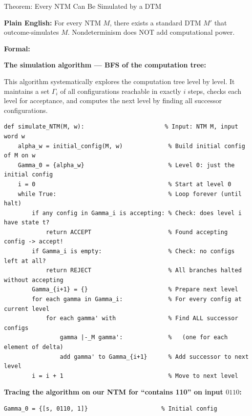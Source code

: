 \documentclass[11pt,a4paper]{article}
\begin{document}
\begin{definitionbox}{{Theorem: Every NTM Can Be Simulated by a DTM}}

\textbf{Plain English:} For every NTM $M$, there exists a standard DTM $M'$ that outcome-simulates $M$. Nondeterminism does NOT add computational power.

\textbf{Formal:}
\begin{center}
\end{center}

\textbf{The simulation algorithm --- BFS of the computation tree:}

This algorithm systematically explores the computation tree level by level. It maintains a set $\Gamma_i$ of all configurations reachable in exactly $i$ steps, checks each level for acceptance, and computes the next level by finding all successor configurations.

\begin{lstlisting}
def simulate_NTM(M, w):                       % Input: NTM M, input word w
    alpha_w = initial_config(M, w)             % Build initial config of M on w
    Gamma_0 = {alpha_w}                        % Level 0: just the initial config
    i = 0                                      % Start at level 0
    while True:                                % Loop forever (until halt)
        if any config in Gamma_i is accepting: % Check: does level i have state t?
            return ACCEPT                      % Found accepting config -> accept!
        if Gamma_i is empty:                   % Check: no configs left at all?
            return REJECT                      % All branches halted without accepting
        Gamma_{i+1} = {}                       % Prepare next level
        for each gamma in Gamma_i:             % For every config at current level
            for each gamma' with               % Find ALL successor configs
                gamma |-_M gamma':             %   (one for each element of delta)
                add gamma' to Gamma_{i+1}      % Add successor to next level
        i = i + 1                              % Move to next level
\end{lstlisting}

\textbf{Tracing the algorithm on our NTM for ``contains 110'' on input $0110$:}

\begin{lstlisting}
Gamma_0 = {[s, 0110, 1]}                     % Initial config


\end{lstlisting}
\end{definitionbox}
\end{document}

